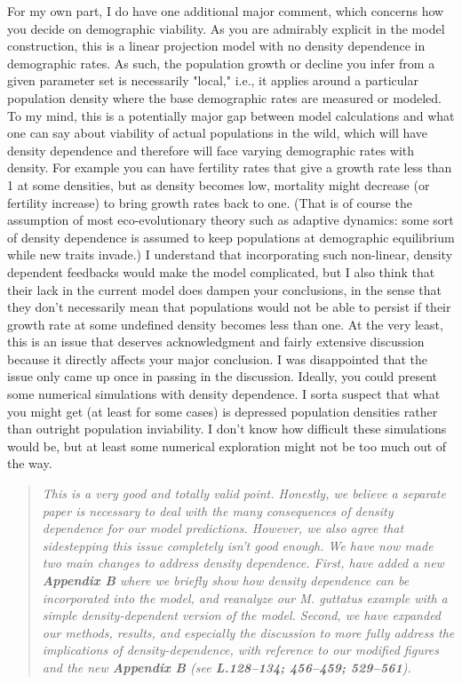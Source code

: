 \documentclass[11pt]{article}
\begin{document}
For my own part, I do have one additional major comment, which concerns how you decide on demographic viability. As you are admirably explicit in the model construction, this is a linear projection model with no density dependence in demographic rates. As such, the population growth or decline you infer from a given parameter set is necessarily "local," i.e., it applies around a particular population density where the base demographic rates are measured or modeled. To my mind, this is a potentially major gap between model calculations and what one can say about viability of actual populations in the wild, which will have density dependence and therefore will face varying demographic rates with density. For example you can have fertility rates that give a growth rate less than 1 at some densities, but as density becomes low, mortality might decrease (or fertility increase) to bring growth rates back to one. (That is of course the assumption of most eco-evolutionary theory such as adaptive dynamics: some sort of density dependence is assumed to keep populations at demographic equilibrium while new traits invade.) I understand that incorporating such non-linear, density dependent feedbacks would make the model complicated, but I also think that their lack in the current model does dampen your conclusions, in the sense that they don’t necessarily mean that populations would not be able to persist if their growth rate at some undefined density becomes less than one. At the very least, this is an issue that deserves acknowledgment and fairly extensive discussion because it directly affects your major conclusion. I was disappointed that the issue only came up once in passing in the discussion. Ideally, you could present some numerical simulations with density dependence. I sorta suspect that what you might get (at least for some cases) is depressed population densities rather than outright population inviability. I don’t know how difficult these simulations would be, but at least some numerical exploration might not be too much out of the way.

\begin{quote}
	{\itshape This is a very good and totally valid point. Honestly, we believe a separate paper is necessary to deal with the many consequences of density dependence for our model predictions. However, we also agree that sidestepping this issue completely isn't good enough. We have now made two main changes to address density dependence. First, have added a new {\bf Appendix B} where we briefly show how density dependence can be incorporated into the model, and reanalyze our {\itshape M. guttatus} example with a simple density-dependent version of the model. Second, we have expanded our methods, results, and especially the discussion to more fully address the implications of density-dependence, with reference to our modified figures and the new {\bf Appendix B} (see {\bf L.128--134; 456--459; 529--561}).}
\end{quote}
\end{document}
